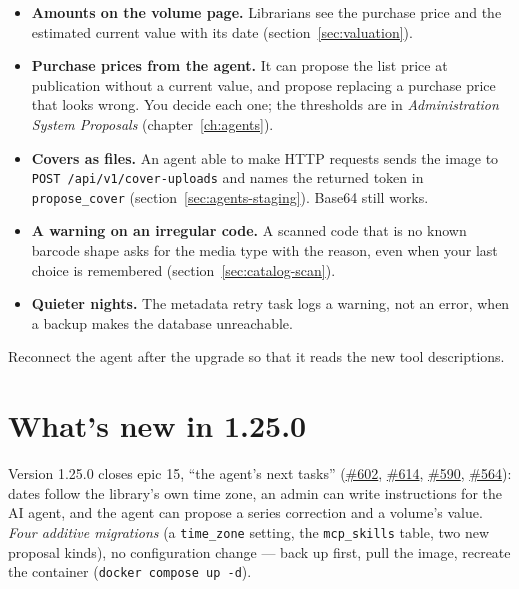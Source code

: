 \begin{itemize}
  \item \textbf{Amounts on the volume page.} Librarians see the purchase
        price and the estimated current value with its date
        (section~\ref{sec:valuation}).
  \item \textbf{Purchase prices from the agent.} It can propose the list
        price at publication without a current value, and propose
        replacing a purchase price that looks wrong. You decide each
        one; the thresholds are in \emph{Administration
        \textrightarrow{} System \textrightarrow{} Proposals}
        (chapter~\ref{ch:agents}).
  \item \textbf{Covers as files.} An agent able to make HTTP requests
        sends the image to \texttt{POST /api/v1/cover-uploads} and names
        the returned token in \texttt{propose\_cover}
        (section~\ref{sec:agents-staging}). Base64 still works.
  \item \textbf{A warning on an irregular code.} A scanned code that is
        no known barcode shape asks for the media type with the reason,
        even when your last choice is remembered
        (section~\ref{sec:catalog-scan}).
  \item \textbf{Quieter nights.} The metadata retry task logs a warning,
        not an error, when a backup makes the database unreachable.
\end{itemize}

Reconnect the agent after the upgrade so that it reads the new tool
descriptions.

\section{What's new in 1.25.0}\label{sec:whats-new-1.25.0}

Version 1.25.0 closes epic 15, ``the agent's next tasks''
(\href{https://github.com/guycorbaz/mybibli/issues/602}{\#602},
\href{https://github.com/guycorbaz/mybibli/issues/614}{\#614},
\href{https://github.com/guycorbaz/mybibli/issues/590}{\#590},
\href{https://github.com/guycorbaz/mybibli/issues/564}{\#564}): dates
follow the library's own time zone, an admin can write instructions for
the AI agent, and the agent can propose a series correction and a
volume's value. \emph{Four additive migrations} (a \texttt{time\_zone}
setting, the \texttt{mcp\_skills} table, two new proposal kinds), no
configuration change --- back up first, pull the image, recreate the
container (\texttt{docker compose up -d}).

